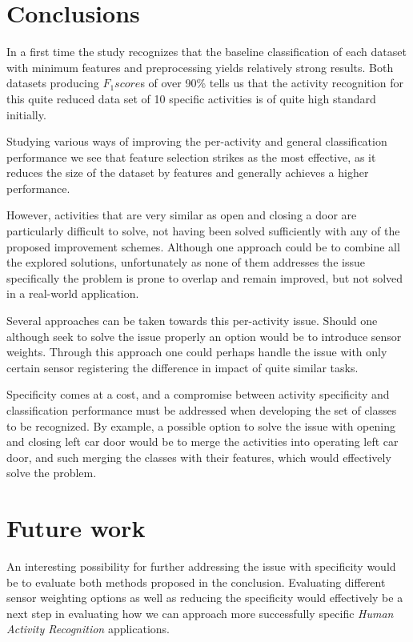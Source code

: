 \documentclass{sig-alternate}
\begin{document}

\section{Conclusions}
In a first time the study recognizes that the baseline classification of each dataset with minimum features and preprocessing yields relatively strong results. Both datasets producing $F_1 score$s of over 90\% tells us that the activity recognition for this quite reduced data set of 10 specific activities is of quite high standard initially.

Studying various ways of improving the per-activity and general classification performance we see that feature selection strikes as the most effective, as it reduces the size of the dataset by features and generally achieves a higher performance.

However, activities that are very similar as open and closing a door are particularly difficult to solve, not having been solved sufficiently with any of the proposed improvement schemes. Although one approach could be to combine all the explored solutions, unfortunately as none of them addresses the issue specifically the problem is prone to overlap and remain improved, but not solved in a real-world application. 

Several approaches can be taken towards this per-activity issue. Should one although seek to solve the issue properly an option would be to introduce sensor weights. Through this approach one could perhaps handle the issue with only certain sensor registering the difference in impact of quite similar tasks.

Specificity comes at a cost, and a compromise between activity specificity and classification performance must be addressed when developing the set of classes to be recognized. By example, a possible option to solve the issue with opening and closing left car door would be to merge the activities into operating left car door, and such merging the classes with their features, which would effectively solve the problem.


\section{Future work}
An interesting possibility for further addressing the issue with specificity would be to evaluate both methods proposed in the conclusion. Evaluating different sensor weighting options as well as reducing the specificity would effectively be a next step in evaluating how we can approach more successfully specific \textit{Human Activity Recognition} applications.
\end{document}

